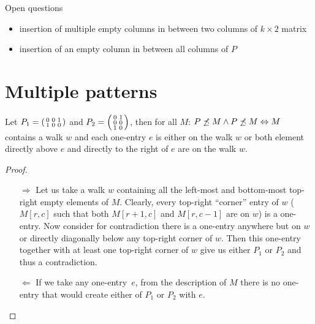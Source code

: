 Open questions
\begin{itemize}
\item insertion of multiple empty columns in between two columns of $k\times2$ matrix
\item insertion of an empty column in between all columns of $P$
\end{itemize}

\section{Multiple patterns}
\begin{thm}
Let $P_1=\left(\begin{smallmatrix}0&0&1\\1&0&0\end{smallmatrix}\right)$ and $P_2=\left(\begin{smallmatrix}0&1\\0&0\\1&0\end{smallmatrix}\right)$, then for all $M$: $P\not\preceq M\wedge P\not\preceq M\Leftrightarrow M$ contains a walk $w$ and each one-entry $e$ is either on the walk $w$ or both element directly above $e$ and directly to the right of $e$ are on the walk $w$.
\end{thm}
\begin{proof}
\begin{itemize}
\item[$\Rightarrow$] Let us take a walk $w$ containing all the left-most and bottom-most top-right empty elements of $M$. Clearly, every top-right ``corner'' entry of $w$ ($M[r,c]$ such that both $M[r+1,c]$ and $M[r,c-1]$ are on $w$) is a one-entry. Now consider for contradiction there is a one-entry anywhere but on $w$ or directly diagonally below any top-right corner of $w$. Then this one-entry together with at least one top-right corner of $w$ give us either $P_1$ or $P_2$ and thus a contradiction.
\item[$\Leftarrow$] If we take any one-entry~$e$, from the description of $M$ there is no one-entry that would create either of $P_1$ or $P_2$ with $e$.
\end{itemize}
\end{proof}